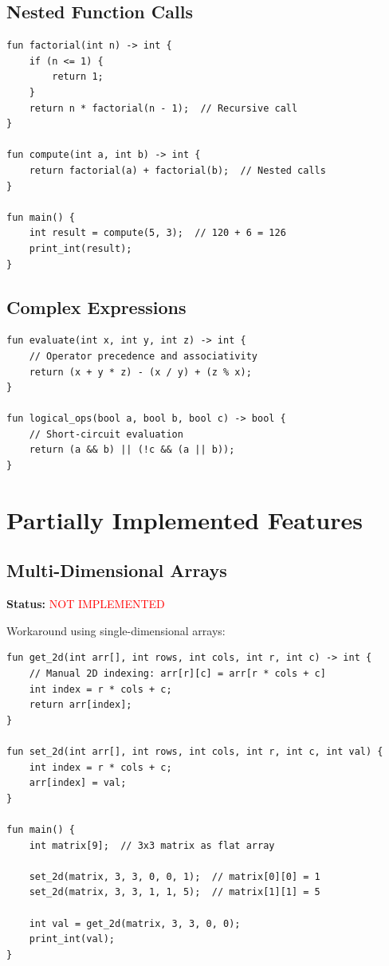 \documentclass[12pt,a4paper,oneside]{book}
\begin{document}
\subsection{Nested Function Calls}

\begin{lstlisting}[style=algo, caption={Nested Function Calls}]
fun factorial(int n) -> int {
    if (n <= 1) {
        return 1;
    }
    return n * factorial(n - 1);  // Recursive call
}

fun compute(int a, int b) -> int {
    return factorial(a) + factorial(b);  // Nested calls
}

fun main() {
    int result = compute(5, 3);  // 120 + 6 = 126
    print_int(result);
}
\end{lstlisting}

\subsection{Complex Expressions}

\begin{lstlisting}[style=algo, caption={Multi-Level Expressions}]
fun evaluate(int x, int y, int z) -> int {
    // Operator precedence and associativity
    return (x + y * z) - (x / y) + (z % x);
}

fun logical_ops(bool a, bool b, bool c) -> bool {
    // Short-circuit evaluation
    return (a && b) || (!c && (a || b));
}
\end{lstlisting}

\section{Partially Implemented Features}

\subsection{Multi-Dimensional Arrays}

\textbf{Status:} \textcolor{red}{NOT IMPLEMENTED}

Workaround using single-dimensional arrays:

\begin{lstlisting}[style=algo, caption={Simulating 2D Arrays}]
fun get_2d(int arr[], int rows, int cols, int r, int c) -> int {
    // Manual 2D indexing: arr[r][c] = arr[r * cols + c]
    int index = r * cols + c;
    return arr[index];
}

fun set_2d(int arr[], int rows, int cols, int r, int c, int val) {
    int index = r * cols + c;
    arr[index] = val;
}

fun main() {
    int matrix[9];  // 3x3 matrix as flat array
    
    set_2d(matrix, 3, 3, 0, 0, 1);  // matrix[0][0] = 1
    set_2d(matrix, 3, 3, 1, 1, 5);  // matrix[1][1] = 5
    
    int val = get_2d(matrix, 3, 3, 0, 0);
    print_int(val);
}
\end{lstlisting}
\end{document}
